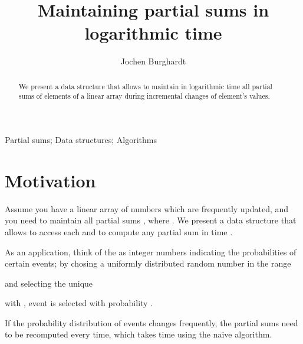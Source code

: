 \documentclass{elsartNoFoot}
\newcommand{\1}{\color{red}}
\newcommand{\2}{\color{green}}
\newcommand{\+}[3]{{\renewcommand{\i}{{#1}}{#3},\ldots,\renewcommand{\i}{{#2}}{#3}}}
\begin{document}
\begin{frontmatter}

\title{Maintaining partial sums in logarithmic time}
\author{Jochen Burghardt}
\address{Berlin}
\begin{keyword}
	Partial sums;
	Data structures;
	Algorithms
\end{keyword}

\begin{abstract}
        We present a data structure that allows to maintain in
        logarithmic time all partial sums of elements of a linear array
        during incremental changes of element's values. 
\end{abstract}

\end{frontmatter}



\section{Motivation}
\label{Motivation}



Assume you have a linear array  of numbers
which are frequently updated, and you need to maintain all partial
sums , where .
We present a data structure that allows to access each  and to
compute any partial sum in time .



As an application, think of the 
as integer numbers indicating the probabilities of certain
events; 
by chosing a uniformly distributed random number  in the range

and selecting the unique 

with
,
event  is selected with probability
.

If the probability distribution of events changes frequently,
the partial sums need to be recomputed every time,
which takes time  using the naive algorithm.
\end{document}
